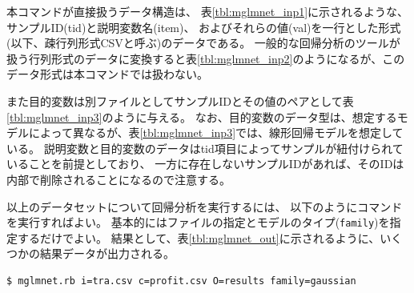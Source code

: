 本コマンドが直接扱うデータ構造は、
表\ref{tbl:mglmnet_inp1}に示されるような、サンプルID(tid)と説明変数名(item)、
およびそれらの値(val)を一行とした形式(以下、疎行列形式CSVと呼ぶ)のデータである。
一般的な回帰分析のツールが扱う行列形式のデータに変換すると表\ref{tbl:mglmnet_inp2}のようになるが、このデータ形式は本コマンドでは扱わない。

また目的変数は別ファイルとしてサンプルIDとその値のペアとして表\ref{tbl:mglmnet_inp3}のように与える。
なお、目的変数のデータ型は、想定するモデルによって異なるが、表\ref{tbl:mglmnet_inp3}では、線形回帰モデルを想定している。
説明変数と目的変数のデータはtid項目によってサンプルが紐付けられていることを前提としており、
一方に存在しないサンプルIDがあれば、そのIDは内部で削除されることになるので注意する。

以上のデータセットについて回帰分析を実行するには、
以下のようにコマンドを実行すればよい。
基本的にはファイルの指定とモデルのタイプ(\verb|family|)を指定するだけでよい。
結果として、表\ref{tbl:mglmnet_out}に示されるように、いくつかの結果データが出力される。

\begin{verbatim}
$ mglmnet.rb i=tra.csv c=profit.csv O=results family=gaussian
\end{verbatim}



